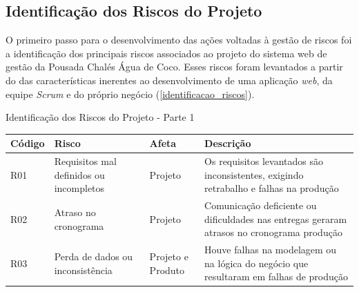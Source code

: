 \documentclass[
	12pt,				%
	openany,			%
	twoside,			%
	a4paper,			%
	english,			%
	french,				%
	spanish,			%
	brazil				%
	]{abntex2}
\begin{document}
\subsection{Identificação dos Riscos do Projeto}
O primeiro passo para o desenvolvimento das ações voltadas à gestão de riscos foi a identificação dos principais riscos associados ao projeto do sistema web de gestão da Pousada Chalés Água de Coco. Esses riscos foram levantados a partir do das características inerentes ao desenvolvimento de uma aplicação \textit{web}, da equipe \textit{Scrum} e do próprio negócio (\autoref{identificacao_riscos}).
\begin{quadro}[H]
	\caption{Identificação dos Riscos do Projeto - Parte 1} \label{identificacao_riscos_1} 
	\begin{tabular}{|p{2.8cm}|p{5cm}|p{3cm}|p{4.2cm}|}
	\hline
	\textbf{Código} & \textbf{Risco} & \textbf{Afeta} & \textbf{Descrição}  \\
	\hline
			R01 & Requisitos mal definidos ou incompletos &
			Projeto  & Os requisitos levantados são inconsistentes, exigindo retrabalho e falhas na produção \\
		\hline
			R02 & Atraso no cronograma &
			Projeto  & Comunicação deficiente ou dificuldades nas entregas geraram atrasos no cronograma produção \\
		\hline
			R03 & Perda de dados ou inconsistência &
			Projeto e Produto  & Houve falhas na modelagem ou na lógica do negócio que resultaram em falhas de produção \\ \hline
\end{tabular}
\end{quadro}		
			
\end{document}
